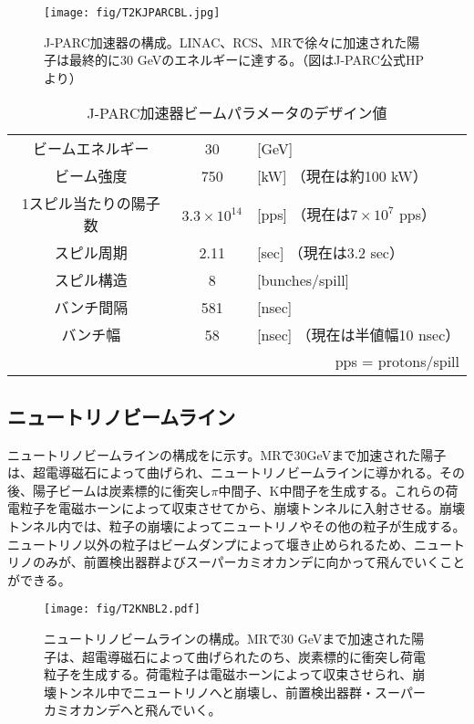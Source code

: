 \begin{figure}[htbp]
\centering
\texttt{[image: fig/T2KJPARCBL.jpg]}
\caption[J-PARC加速器の構成]{J-PARC加速器の構成。LINAC、RCS、MRで徐々に加速された陽子は最終的に30 GeVのエネルギーに達する。（図はJ-PARC公式HPより）}
\label{JPARC}
\end{figure}

\begin{table}[htbp]
\caption[J-PARC加速器ビームパラメータのデザイン値]{J-PARC加速器ビームパラメータのデザイン値}
\begin{center}
\begin{tabular}{ccl}
\hline \hline
ビームエネルギー & 30 & [GeV]\\
ビーム強度 & 750 &[kW] （現在は約100 kW）\\
1スピル当たりの陽子数 & $3.3 \times 10^{14}$ & [pps] （現在は$7\times10^{7}$ pps）\\
スピル周期 & 2.11 & [sec] （現在は3.2 sec）\\
スピル構造 & 8 &[bunches/spill]\\
バンチ間隔 & 581 & [nsec]\\
バンチ幅 & 58 & [nsec] （現在は半値幅10 nsec）\\
\hline \hline
\multicolumn{3}{r}{pps = protons/spill}\\
\end{tabular}
\end{center}
\label{JPARCBeamlineSpec}
\end{table}%

\newpage
\subsection{ニュートリノビームライン}
ニュートリノビームラインの構成をに示す。MRで30GeVまで加速された陽子は、超電導磁石によって曲げられ、ニュートリノビームラインに導かれる。その後、陽子ビームは炭素標的に衝突し$\pi$中間子、K中間子を生成する。これらの荷電粒子を電磁ホーンによって収束させてから、崩壊トンネルに入射させる。崩壊トンネル内では、粒子の崩壊によってニュートリノやその他の粒子が生成する。ニュートリノ以外の粒子はビームダンプによって堰き止められるため、ニュートリノのみが、前置検出器群よびスーパーカミオカンデに向かって飛んでいくことができる。

\begin{figure}[htbp]
\centering
\texttt{[image: fig/T2KNBL2.pdf]}
\caption[ニュートリノビームラインの構成]{ニュートリノビームラインの構成。MRで30 GeVまで加速された陽子は、超電導磁石によって曲げられたのち、炭素標的に衝突し荷電粒子を生成する。荷電粒子は電磁ホーンによって収束させられ、崩壊トンネル中でニュートリノへと崩壊し、前置検出器群・スーパーカミオカンデへと飛んでいく。}
\label{T2KNeutrinoBeamline}
\end{figure}

